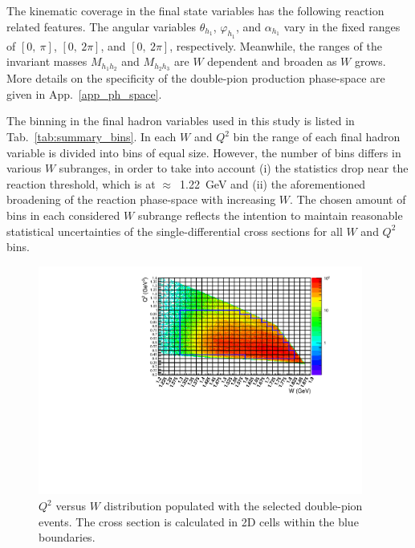 The kinematic coverage in the final state variables has the following reaction related features. The angular variables $\theta_{h_{1}}$, $\varphi_{h_{1}}$, and $\alpha_{h_{1}}$ vary in the fixed ranges of $[0,~\pi]$, $[0,~2\pi]$, and $[0,~2\pi]$, respectively. Meanwhile, the ranges of the invariant masses $M_{h_{1}h_{2}}$ and $M_{h_{2}h_{3}}$ are $W$ dependent and broaden as $W$ grows. More details on the specificity of the double-pion production phase-space are given in App.~\ref{app_ph_space}. 

The binning in the final hadron variables used in this study is listed in Tab.~\ref{tab:summary_bins}. In each $W$ and $Q^{2}$ bin the range of each final hadron variable is divided into bins of equal size. However, the number of bins differs in various $W$ subranges, in order to take into account (i) the statistics drop near the reaction threshold, which is at $\approx$~1.22~GeV and (ii) the aforementioned broadening of the reaction phase-space with increasing $W$. The chosen amount of bins in each considered $W$ subrange reflects the intention to maintain reasonable statistical uncertainties of the single-differential cross sections for all $W$ and $Q^2$ bins. 


\begin{figure}[htp]
\begin{center}
\includegraphics[width=0.95\textwidth]{pictures/cross_section/q2vsw_new.pdf}
\caption{\small $Q^2$ versus $W$ distribution populated with the selected double-pion events. The cross section is calculated in 2D cells within the blue boundaries.} \label{fig:q2_vs_w}
\end{center}
\end{figure}


